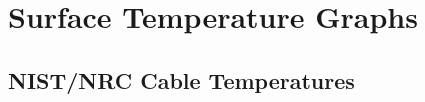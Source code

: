 \chapter{Surface Temperature Graphs}

\clearpage







\section{NIST/NRC Cable Temperatures}




\clearpage













